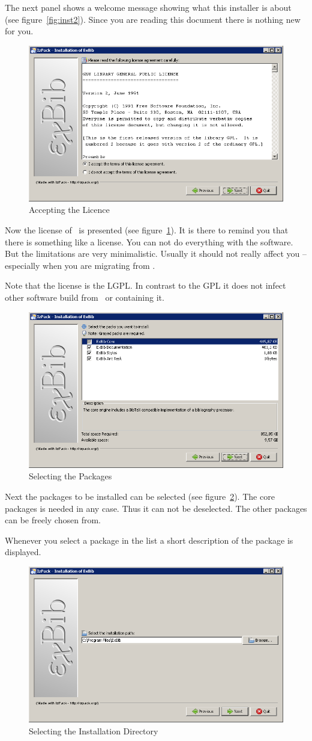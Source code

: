 The next panel shows a welcome message showing what this installer is
about (see figure~\ref{fig:inst2}). Since you are reading this
document there is nothing new for you.

\begin{figure}[!ht]
  \centering
  \includegraphics[width=.45\textwidth]{img/inst4}
  \caption{Accepting the Licence}
  \label{fig:inst3}
\end{figure}

Now the license of \ExBib\ is presented (see
figure~\ref{fig:inst3}). It is there to remind you that there is
something like a license. You can not do everything with the software.
But the limitations are very minimalistic. Usually it should not
really affect you -- especially when you are migrating from \BibTeX.

Note that the license is the LGPL. In
contrast to the GPL it does not infect
other software build from \ExBib\ or containing it.

\begin{figure}[!ht]
  \centering
  \includegraphics[width=.45\textwidth]{img/inst5}
  \caption{Selecting the Packages}
  \label{fig:inst4}
\end{figure}

Next the packages to be installed can be selected (see
figure~\ref{fig:inst4}). The core packages is needed in any case. Thus
it can not be deselected. The other packages can be freely chosen
from.

Whenever you select a package in the list a short description of the
package is displayed.

\begin{figure}[!ht]
  \centering
  \includegraphics[width=.45\textwidth]{img/inst6}
  \caption{Selecting the Installation Directory}
  \label{fig:inst5}
\end{figure}

